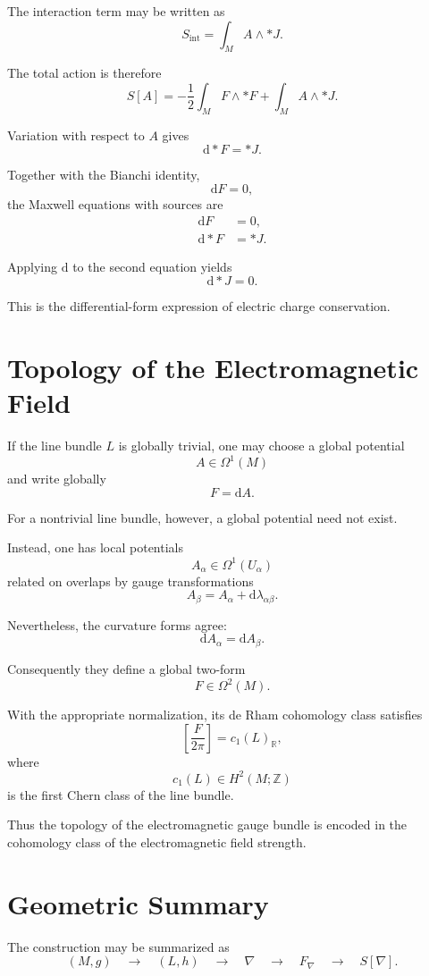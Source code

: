 \documentclass[11pt,a4paper]{article}
\newcommand{\R}{\mathbb{R}}
\newcommand{\Z}{\mathbb{Z}}
\newcommand{\dd}{\mathrm{d}}
\begin{document}
The interaction term may be written as
\[
S_{\mathrm{int}}
=
\int_M A\wedge *J.
\]

The total action is therefore
\[
S[A]
=
-\frac12\int_M F\wedge *F
+
\int_M A\wedge *J.
\]

Variation with respect to $A$ gives
\[
\boxed{
\dd *F=*J.
}
\]

Together with the Bianchi identity,
\[
\boxed{
\dd F=0,
}
\]
the Maxwell equations with sources are
\[
\boxed{
\begin{aligned}
\dd F&=0,\\
\dd *F&=*J.
\end{aligned}
}
\]

Applying $\dd$ to the second equation yields
\[
\dd *J=0.
\]

This is the differential-form expression of electric charge
conservation.

\section{Topology of the Electromagnetic Field}

If the line bundle $L$ is globally trivial, one may choose a global
potential
\[
A\in\Omega^1(M)
\]
and write globally
\[
F=\dd A.
\]

For a nontrivial line bundle, however, a global potential need not
exist.

Instead, one has local potentials
\[
A_\alpha\in\Omega^1(U_\alpha)
\]
related on overlaps by gauge transformations
\[
A_\beta
=
A_\alpha+\dd\lambda_{\alpha\beta}.
\]

Nevertheless, the curvature forms agree:
\[
\dd A_\alpha
=
\dd A_\beta.
\]

Consequently they define a global two-form
\[
F\in\Omega^2(M).
\]

With the appropriate normalization, its de Rham cohomology class
satisfies
\[
\left[
\frac{F}{2\pi}
\right]
=
c_1(L)_{\R},
\]
where
\[
c_1(L)\in H^2(M;\Z)
\]
is the first Chern class of the line bundle.

Thus the topology of the electromagnetic gauge bundle is encoded
in the cohomology class of the electromagnetic field strength.

\section{Geometric Summary}

The construction may be summarized as
\[
\boxed{
(M,g)
\quad\longrightarrow\quad
(L,h)
\quad\longrightarrow\quad
\nabla
\quad\longrightarrow\quad
F_\nabla
\quad\longrightarrow\quad
S[\nabla].
}
\]
\end{document}
